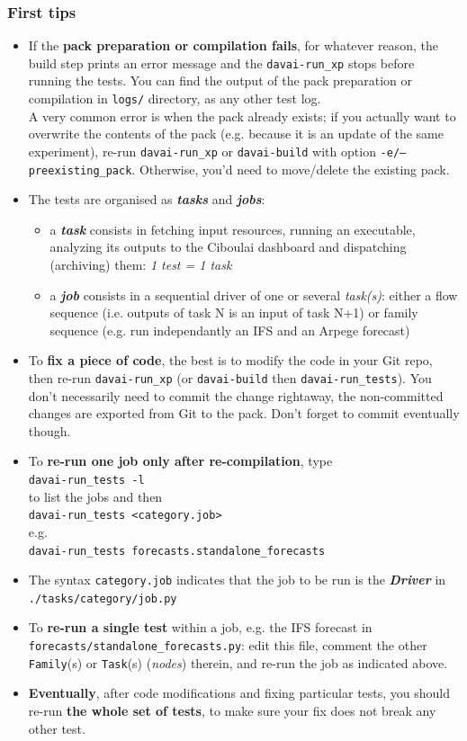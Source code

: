 \documentclass[a4paper,10pt,twoside]{article}
\begin{document}
\subsubsection{First tips}
\begin{itemize}
 \item If the \textbf{pack preparation or compilation fails}, for whatever reason, the build step prints an error message and the \texttt{davai-run\_xp} stops before running the tests. You can find the output of the pack preparation or compilation in \texttt{logs/} directory, as any other test log.\\
 A very common error is when the pack already exists; if you actually want to overwrite the contents of the pack (e.g. because it is an update of the same experiment), re-run \texttt{davai-run\_xp} or \texttt{davai-build} with option \texttt{-e/--preexisting\_pack}. Otherwise, you'd need to move/delete the existing pack.
 \item The tests are organised as \textit{\textbf{tasks}} and \textit{\textbf{jobs}}:
  \begin{itemize}
   \item a \textit{\textbf{task}} consists in fetching input resources, running an executable, analyzing its outputs to the Ciboulai dashboard and dispatching (archiving) them: \textit{1 test = 1 task}
   \item a \textit{\textbf{job}} consists in a sequential driver of one or several \textit{task(s)}: either a flow sequence (i.e. outputs of task N is an input of task N+1) or family sequence (e.g. run independantly an IFS and an Arpege forecast)
  \end{itemize}
 \item To \textbf{fix a piece of code}, the best is to modify the code in your Git repo, then re-run \texttt{davai-run\_xp} (or \texttt{davai-build} then \texttt{davai-run\_tests}). You don't necessarily need to commit the change rightaway, the non-committed changes are exported from Git to the pack. Don't forget to commit eventually though.
 \item To \textbf{re-run one job only after re-compilation}, type\\ \texttt{davai-run\_tests -l}\\
 to list the jobs and then\\
 \texttt{davai-run\_tests <category.job>}\\
 e.g.\\
 \texttt{davai-run\_tests forecasts.standalone\_forecasts}
 \item The syntax \texttt{category.job} indicates that the job to be run is the \textit{\textbf{Driver}} in \texttt{./tasks/category/job.py}
 \item To \textbf{re-run a single test} within a job, e.g. the IFS forecast in \texttt{forecasts/standalone\_forecasts.py}: edit this file, comment the other \texttt{Family}(s) or \texttt{Task}(s) (\textit{nodes}) therein, and re-run the job as indicated above.
 \item \textbf{Eventually}, after code modifications and fixing particular tests, you should re-run \textbf{the whole set of tests}, to make sure your fix does not break any other test.
\end{itemize}
\end{document}
